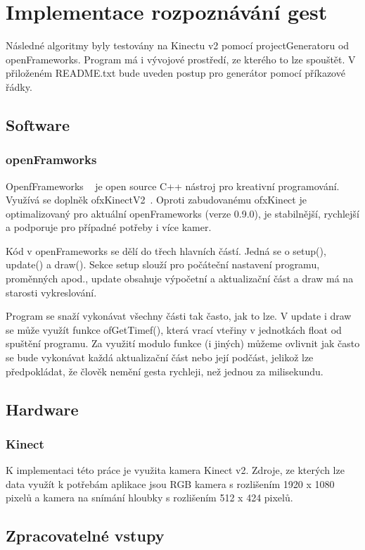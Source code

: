 \chapter{Implementace rozpoznávání gest}
Následné algoritmy byly testovány na Kinectu v2 pomocí projectGeneratoru od openFrameworks. Program má i vývojové prostředí, ze kterého to lze spouštět. V přiloženém README.txt bude uveden postup pro generátor pomocí příkazové řádky.

\section{Software}
\subsection{openFramworks}
OpenfFrameworks ~\cite{1} je open source C++ nástroj pro kreativní programování.\\
Využívá se doplněk ofxKinectV2~\cite{2}. Oproti zabudovanému ofxKinect je optimalizovaný pro aktuální openFrameworks (verze 0.9.0), je stabilnější, rychlejší a podporuje pro případné potřeby i více kamer.

Kód v openFrameworks se dělí do třech hlavních částí. Jedná se o setup(), update() a draw(). Sekce setup slouží pro počáteční nastavení programu, proměnných apod., update obsahuje výpočetní a aktualizační část a draw má na starosti vykreslování.

Program se snaží vykonávat všechny části tak často, jak to lze. V update i draw se může využít funkce ofGetTimef(), která vrací vteřiny v jednotkách float od spuštění programu. Za využití modulo funkce (i jiných) můžeme ovlivnit jak často se bude vykonávat každá aktualizační část nebo její podčást, jelikož lze předpokládat, že člověk nemění gesta rychleji, než jednou za milisekundu. %

\section{Hardware}
\subsection{Kinect}
K implementaci této práce je využita kamera Kinect v2. Zdroje, ze kterých lze data využít k potřebám aplikace jsou RGB kamera s rozlišením 1920 x 1080 pixelů a kamera na snímání hloubky s rozlišením 512 x 424 pixelů.

\section{Zpracovatelné vstupy}

